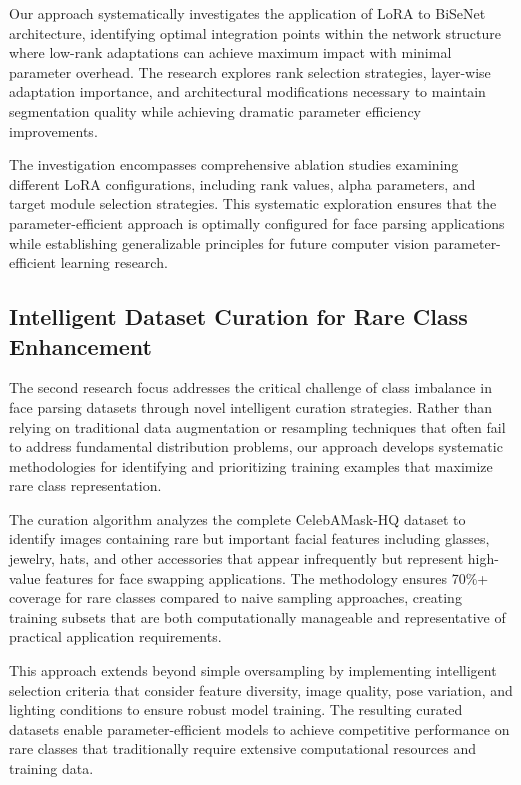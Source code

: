 \documentclass[12pt,a4paper]{report}
\begin{document}
Our approach systematically investigates the application of LoRA to BiSeNet architecture, identifying optimal integration points within the network structure where low-rank adaptations can achieve maximum impact with minimal parameter overhead. The research explores rank selection strategies, layer-wise adaptation importance, and architectural modifications necessary to maintain segmentation quality while achieving dramatic parameter efficiency improvements.

The investigation encompasses comprehensive ablation studies examining different LoRA configurations, including rank values, alpha parameters, and target module selection strategies. This systematic exploration ensures that the parameter-efficient approach is optimally configured for face parsing applications while establishing generalizable principles for future computer vision parameter-efficient learning research.

\subsection{Intelligent Dataset Curation for Rare Class Enhancement}

The second research focus addresses the critical challenge of class imbalance in face parsing datasets through novel intelligent curation strategies. Rather than relying on traditional data augmentation or resampling techniques that often fail to address fundamental distribution problems, our approach develops systematic methodologies for identifying and prioritizing training examples that maximize rare class representation.

The curation algorithm analyzes the complete CelebAMask-HQ dataset to identify images containing rare but important facial features including glasses, jewelry, hats, and other accessories that appear infrequently but represent high-value features for face swapping applications. The methodology ensures 70\%+ coverage for rare classes compared to naive sampling approaches, creating training subsets that are both computationally manageable and representative of practical application requirements.

This approach extends beyond simple oversampling by implementing intelligent selection criteria that consider feature diversity, image quality, pose variation, and lighting conditions to ensure robust model training. The resulting curated datasets enable parameter-efficient models to achieve competitive performance on rare classes that traditionally require extensive computational resources and training data.
\end{document}
